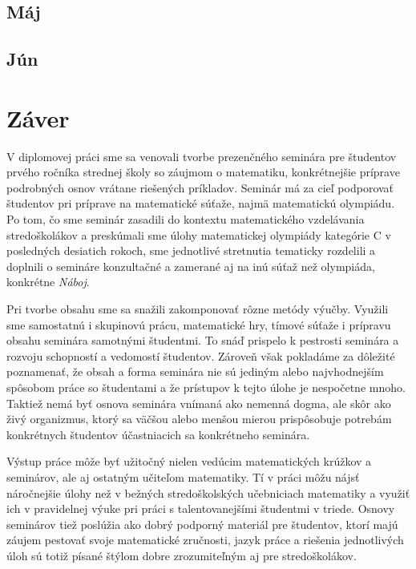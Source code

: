 \section{Máj}




\section{Jún}



\chapter*{Záver} \label{chap:zaver}

V diplomovej práci sme sa venovali tvorbe prezenčného seminára pre študentov prvého ročníka strednej školy so záujmom o matematiku, konkrétnejšie príprave podrobných osnov vrátane riešených príkladov. Seminár má za cieľ podporovať študentov pri príprave na matematické súťaže, najmä matematickú olympiádu. Po tom, čo sme seminár zasadili do kontextu matematického vzdelávania stredoškolákov a preskúmali sme úlohy matematickej olympiády kategórie C v posledných desiatich rokoch, sme jednotlivé stretnutia tematicky rozdelili a doplnili o semináre konzultačné a zamerané aj na inú súťaž než olympiáda, konkrétne \textit{Náboj}.

Pri tvorbe obsahu sme sa snažili zakomponovať rôzne metódy výučby. Využili sme samostatnú i skupinovú prácu, matematické hry, tímové súťaže i prípravu obsahu seminára samotnými študentmi. To snáď prispelo k pestrosti seminára a rozvoju schopností a vedomostí študentov. Zároveň však pokladáme za dôležité poznamenať, že obsah a forma seminára nie sú jediným  alebo najvhodnejším spôsobom práce so študentami a že prístupov k tejto úlohe je nespočetne mnoho. Taktiež nemá byť osnova seminára vnímaná ako nemenná dogma, ale skôr ako živý organizmus, ktorý sa väčšou alebo menšou mierou prispôsobuje potrebám konkrétnych študentov účastniacich sa konkrétneho seminára.

Výstup práce môže byť užitočný nielen vedúcim matematických krúžkov a seminárov, ale aj ostatným učiteľom matematiky. Tí v práci môžu nájsť náročnejšie úlohy než v bežných stredoškolských učebniciach matematiky a využiť ich v pravidelnej výuke pri práci s talentovanejšími študentmi v triede. Osnovy seminárov tiež poslúžia ako dobrý podporný materiál pre študentov, ktorí majú záujem pestovať svoje matematické zručnosti, jazyk práce a riešenia jednotlivých úloh sú totiž písané štýlom dobre zrozumiteľným aj pre stredoškolákov.

